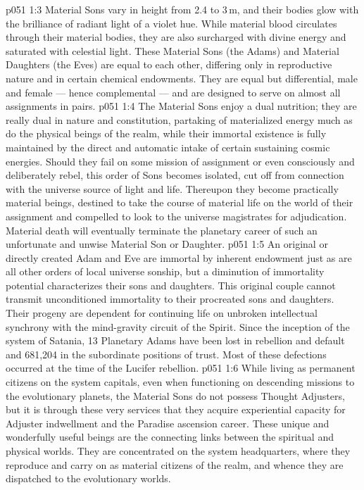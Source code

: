 \vs p051 1:3 \pc Material Sons vary in height from 2.4 to 3\,m, and their bodies glow with the brilliance of radiant light of a violet hue. While material blood circulates through their material bodies, they are also surcharged with divine energy and saturated with celestial light. These Material Sons (the Adams) and Material Daughters (the Eves) are equal to each other, differing only in reproductive nature and in certain chemical endowments. They are equal but differential, male and female --- hence complemental --- and are designed to serve on almost all assignments in pairs.
\vs p051 1:4 The Material Sons enjoy a dual nutrition; they are really dual in nature and constitution, partaking of materialized energy much as do the physical beings of the realm, while their immortal existence is fully maintained by the direct and automatic intake of certain sustaining cosmic energies. Should they fail on some mission of assignment or even consciously and deliberately rebel, this order of Sons becomes isolated, cut off from connection with the universe source of light and life. Thereupon they become practically material beings, destined to take the course of material life on the world of their assignment and compelled to look to the universe magistrates for adjudication. Material death will eventually terminate the planetary career of such an unfortunate and unwise Material Son or Daughter.
\vs p051 1:5 An original or directly created Adam and Eve are immortal by inherent endowment just as are all other orders of local universe sonship, but a diminution of immortality potential characterizes their sons and daughters. This original couple cannot transmit unconditioned immortality to their procreated sons and daughters. Their progeny are dependent for continuing life on unbroken intellectual synchrony with the mind\hyp{}gravity circuit of the Spirit. Since the inception of the system of Satania, 13 Planetary Adams have been lost in rebellion and default and 681,204 in the subordinate positions of trust. Most of these defections occurred at the time of the Lucifer rebellion.
\vs p051 1:6 \pc While living as permanent citizens on the system capitals, even when functioning on descending missions to the evolutionary planets, the Material Sons do not possess Thought Adjusters, but it is through these very services that they acquire experiential capacity for Adjuster indwellment and the Paradise ascension career. These unique and wonderfully useful beings are the connecting links between the spiritual and physical worlds. They are concentrated on the system headquarters, where they reproduce and carry on as material citizens of the realm, and whence they are dispatched to the evolutionary worlds.

